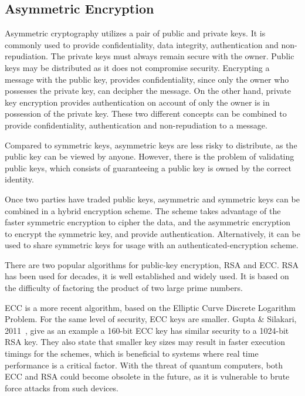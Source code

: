 \subsection{Asymmetric Encryption}\label{chap:background:crypto:assymetric}

Asymmetric cryptography utilizes a pair of public and private keys. It is commonly used to provide confidentiality, data integrity, authentication and non-repudiation.
The private keys must always remain secure with the owner. Public keys may be distributed as it does not compromise security. Encrypting a message with the public key, provides confidentiality, since only the owner who possesses the private key, can decipher the message. On the other hand, private key encryption provides authentication on account of only the owner is in possession of the private key. These two different concepts can be combined to provide confidentiality, authentication and non-repudiation to a message.

Compared to symmetric keys, asymmetric keys are less risky to distribute, as the public key can be viewed by anyone. However, there is the problem of validating public keys, which consists of guaranteeing a public key is owned by the correct identity.

Once two parties have traded public keys, asymmetric and symmetric keys can be combined in a hybrid encryption scheme. The scheme takes advantage of the faster symmetric encryption to cipher the data, and the asymmetric encryption to encrypt the symmetric key, and provide authentication. Alternatively, it can be used to share symmetric keys for usage with an authenticated-encryption scheme.

There are two popular algorithms for public-key encryption, \ac{RSA} and \ac{ECC}.
\ac{RSA} has been used for decades, it is well established and widely used. It is based on the difficulty of factoring the product of two large prime numbers.

\ac{ECC} is a more recent algorithm, based on the Elliptic Curve Discrete Logarithm Problem. For the same level of security, \ac{ECC} keys are smaller. Gupta \& Silakari, 2011~\cite{eccoverrsa}, give as an example a 160-bit \ac{ECC} key has similar security to a 1024-bit \ac{RSA} key. They also state that smaller key sizes may result in faster execution timings for the schemes, which is beneficial to systems where real time performance is a critical factor.
With the threat of quantum computers, both \ac{ECC} and \ac{RSA} could become obsolete in the future, as it is vulnerable to brute force attacks from such devices.

